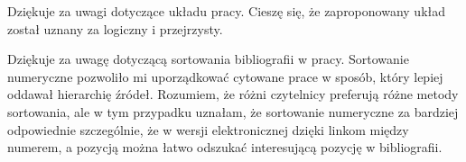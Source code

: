 
\begin{frame}[t]
    \begin{block}{\tb}
\end{block}

\begin{block}{\tb}
\end{block}

Dziękuje za uwagi dotyczące układu  pracy. Cieszę się, że zaproponowany  układ został uznany za logiczny i przejrzysty. 


\begin{block}{\tb}
\end{block}

Dziękuje za uwagę dotyczącą sortowania bibliografii w pracy. 
Sortowanie numeryczne pozwoliło mi uporządkować cytowane prace w sposób, który lepiej oddawał hierarchię źródeł. 
Rozumiem, że różni czytelnicy preferują różne metody sortowania, ale w tym przypadku uznałam, że sortowanie numeryczne za bardziej odpowiednie szczególnie, że w wersji elektronicznej dzięki linkom między numerem, a pozycją można łatwo odszukać interesującą pozycję w bibliografii.


\end{frame}





